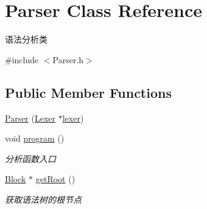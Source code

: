 \hypertarget{class_parser}{}\section{Parser Class Reference}
\label{class_parser}


语法分析类  




{\ttfamily \#include $<$Parser.\+h$>$}

\subsection*{Public Member Functions}
\begin{DoxyCompactItemize}
\item 
\hyperlink{class_parser_a25929f4bcec5c5ff010218f001203b73}{Parser} (\hyperlink{class_lexer}{Lexer} $\ast$\hyperlink{class_parser_a8a8214126b0b0455e3ce375f3e9b20bf}{lexer})
\item 
void \hyperlink{class_parser_af213985eb12738d0dbf7d505a8795ea2}{program} ()
\begin{DoxyCompactList}\small\item\em 分析函数入口 \end{DoxyCompactList}\item 
\hyperlink{class_block}{Block} $\ast$ \hyperlink{class_parser_ad05b2f1f2e9f60a7373961da0588eb5b}{get\+Root} ()
\begin{DoxyCompactList}\small\item\em 获取语法树的根节点 \end{DoxyCompactList}\end{DoxyCompactItemize}
